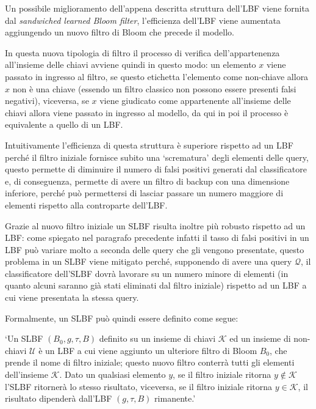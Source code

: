 \documentclass[../../main.tex]{subfiles}
\begin{document}
    Un possibile miglioramento dell'appena descritta struttura dell'LBF viene fornita dal \textit{sandwiched learned Bloom filter}, l'efficienza dell'LBF viene aumentata aggiungendo un nuovo filtro di Bloom che precede il modello.

    In questa nuova tipologia di filtro il processo di verifica dell'appartenenza all'insieme delle chiavi avviene quindi in questo modo: un elemento $x$ viene passato in ingresso al filtro, se questo etichetta l'elemento come non-chiave allora $x$ non è una chiave (essendo un filtro classico non possono essere presenti falsi negativi), viceversa, se $x$ viene giudicato come appartenente all'insieme delle chiavi allora viene passato in ingresso al modello, da qui in poi il processo è equivalente a quello di un LBF.

    Intuitivamente l'efficienza di questa struttura è superiore rispetto ad un LBF perché il filtro iniziale fornisce subito una `scrematura' degli elementi delle query, questo permette di diminuire il numero di falsi positivi generati dal classificatore e, di conseguenza, permette di avere un filtro di backup con una dimensione inferiore, perché può permettersi di lasciar passare un numero maggiore di elementi rispetto alla controparte dell'LBF.

    Grazie al nuovo filtro iniziale un SLBF risulta inoltre più robusto rispetto ad un LBF: come spiegato nel paragrafo precedente infatti il tasso di falsi positivi in un LBF può variare molto a seconda delle query che gli vengono presentate, questo problema in un SLBF viene mitigato perché, supponendo di avere una query $\mathcal{Q}$, il classificatore dell'SLBF dovrà lavorare su un numero minore di elementi (in quanto alcuni saranno già stati eliminati dal filtro iniziale) rispetto ad un LBF a cui viene presentata la stessa query.

    Formalmente, un SLBF può quindi essere definito come segue: 

    `Un SLBF $(B_0, g, \tau, B)$ definito su un insieme di chiavi $\mathcal{K}$ ed un insieme di non-chiavi $\mathcal{U}$ è un LBF a cui viene aggiunto un ulteriore filtro di Bloom $B_0$, che prende il nome di filtro iniziale; questo nuovo filtro conterrà tutti gli elementi dell'insieme $\mathcal{K}$. Dato un qualsiasi elemento $y$, se il filtro iniziale ritorna $y \notin \mathcal{K}$ l'SLBF ritornerà lo stesso risultato, viceversa, se il filtro iniziale ritorna $y \in \mathcal{K}$, il risultato dipenderà dall'LBF $(g, \tau, B)$ rimanente.'
\end{document}
